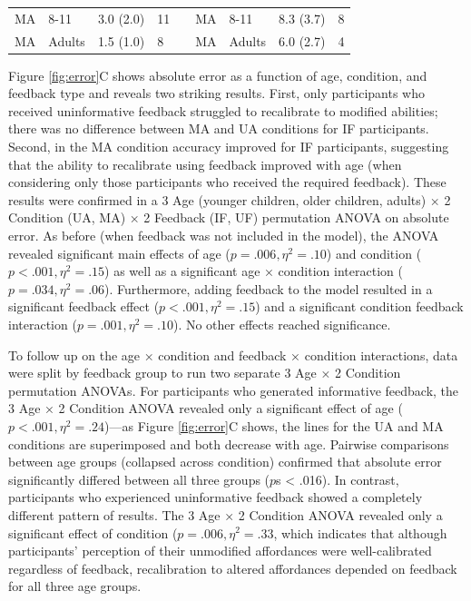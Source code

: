 \documentclass[a4paper,man,natbib,floatsintext,noextraspace]{apa6}
\begin{document}
\begin{table}
\begin{tabular}{@{}lllllllll@{}}
MA                              & 8-11                     & 3.0 (2.0)                            & 11                              &                       & MA                             & 8-11                     & 8.3 (3.7)                   & 8                      \\
MA                              & Adults                   & 1.5 (1.0)                            & 8                               &                       & MA                             & Adults                   & 6.0 (2.7)                   & 4                      \\ \bottomrule
\end{tabular}
\end{table}

Figure \ref{fig:error}C shows absolute error as a function of age, condition, and feedback type and reveals two striking results. First, only participants who received uninformative feedback struggled to recalibrate to modified abilities; there was no difference between MA and UA conditions for IF participants. Second, in the MA condition accuracy improved for IF participants, suggesting that the ability to recalibrate using feedback improved with age (when considering only those participants who received the required feedback). These results were confirmed in a 3 Age (younger children, older children, adults) × 2 Condition (UA, MA) × 2 Feedback (IF, UF) permutation ANOVA on absolute error. As before (when feedback was not included in the model), the ANOVA revealed significant main effects of age ($p = .006, \eta^{2} = .10$) and condition ($p < .001, \eta^{2} = .15$) as well as a significant age × condition interaction ($p = .034, \eta^{2} = .06$). Furthermore, adding feedback to the model resulted in a significant feedback effect ($p < .001, \eta^{2} = .15$) and a significant condition feedback interaction ($p = .001, \eta^{2} = .10$). No other effects reached significance. 

To follow up on the age × condition and feedback × condition interactions, data were split by feedback group to run two separate 3 Age × 2 Condition permutation ANOVAs. For participants who generated informative feedback, the 3 Age × 2 Condition ANOVA revealed only a significant effect of age ($p < .001, \eta^{2} = .24$)---as Figure \ref{fig:error}C shows, the lines for the UA and MA conditions are superimposed and both decrease with age. Pairwise comparisons between age groups (collapsed across condition) confirmed that absolute error significantly differed between all three groups ($p$s < .016). In contrast, participants who experienced uninformative feedback showed a completely different pattern of results. The 3 Age × 2 Condition ANOVA revealed only a significant effect of condition ($p = .006, \eta^{2} = .33$, which indicates that although participants' perception of their unmodified affordances were well-calibrated regardless of feedback, recalibration to altered affordances depended on feedback for all three age groups.
\end{document}
